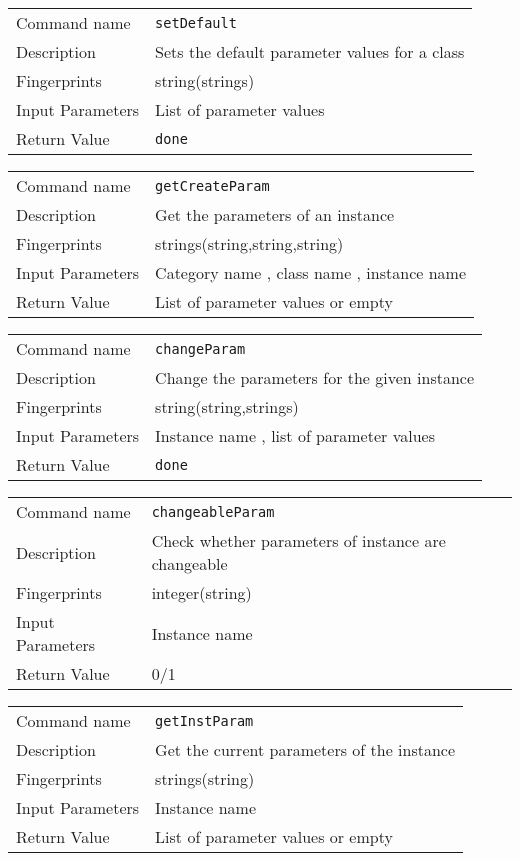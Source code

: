 \noindent
\begin{tabular}{l|p{5in}}
\hline
Command name &{\tt setDefault }\\ 
Description &
 Sets the default parameter values for a class 
 	\\
Fingerprints & string(strings)\\
Input Parameters& List of parameter values \\
Return Value&{\tt done}\\
\hline
\end{tabular}
\bigskip

\noindent
\begin{tabular}{l|p{5in}}
\hline
Command name &{\tt getCreateParam }\\ 
Description &
 Get the parameters of an instance 
 	\\
Fingerprints & strings(string,string,string)\\
Input Parameters& Category name , class name , instance name \\
Return Value& List of parameter values or empty \\
\hline
\end{tabular}
\bigskip

\noindent
\begin{tabular}{l|p{5in}}
\hline
Command name &{\tt changeParam }\\ 
Description &
 Change the parameters for the given instance 
 	\\
Fingerprints & string(string,strings)\\
Input Parameters& Instance name , list of parameter values \\
Return Value&{\tt done}\\
\hline
\end{tabular}
\bigskip

\noindent
\begin{tabular}{l|p{5in}}
\hline
Command name &{\tt changeableParam }\\ 
Description &
 Check whether parameters of instance are changeable 
 	\\
Fingerprints & integer(string)\\
Input Parameters& Instance name \\
Return Value& 0/1 \\
\hline
\end{tabular}
\bigskip

\noindent
\begin{tabular}{l|p{5in}}
\hline
Command name &{\tt getInstParam }\\ 
Description &
 Get the current parameters of the instance 
 	\\
Fingerprints & strings(string)\\
Input Parameters& Instance name \\
Return Value& List of parameter values or empty \\
\hline
\end{tabular}
\bigskip

